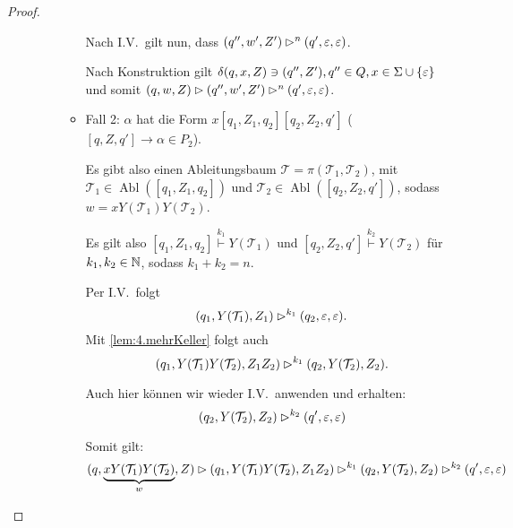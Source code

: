 \begin{proof}
\begin{itemize}
\begin{description}
\begin{itemize}
	  Nach I.V.\ gilt nun, dass $(q'', w', Z') \rhd^n (q',\varepsilon,\varepsilon)$.
	  
	  Nach Konstruktion gilt $\delta(q, x, Z) \ni (q'', Z'), q'' \in Q, x \in \Sigma \cup \{\varepsilon\}$ und somit
	  $(q, w, Z) \rhd (q'', w', Z') \rhd^n (q',\varepsilon,\varepsilon)$.
      \item Fall 2: $\alpha$ hat die Form $x[q_1,Z_1,q_2][q_2, Z_2, q']$ ($[q,Z,q']\rightarrow\alpha \in P_2$).
      
      Es gibt also einen Ableitungsbaum $\mathcal{T} = \pi(\mathcal{T}_1,\mathcal{T}_2)$, mit $\mathcal{T}_1 \in \operatorname{Abl}([q_1, Z_1, q_2])$ und $\mathcal{T}_2 \in \operatorname{Abl}([q_2, Z_2, q'])$, sodass $w = xY(\mathcal{T}_1)Y(\mathcal{T}_2)$.
      
      Es gilt also $[q_1, Z_1, q_2]\stackrel{k_1}{\vdash} Y(\mathcal{T}_1)$ und 
      $[q_2, Z_2, q']\stackrel{k_2}{\vdash} Y(\mathcal{T}_2)$ für $k_1,k_2\in\mathbb{N}$, sodass $k_1+k_2=n$.
      
          Per I.V.\ folgt
          \begin{displaymath}
            (q_1, Y(\mathcal{T}_1), Z_1) \rhd^{k_1} (q_2, \varepsilon, \varepsilon).
          \end{displaymath}
          Mit \autoref{lem:4.mehrKeller} folgt auch
          \begin{displaymath}
            (q_1, Y(\mathcal{T}_1)Y(\mathcal{T}_2), Z_1Z_2) \rhd^{k_1} (q_2, Y(\mathcal{T}_2), Z_2).
          \end{displaymath}
          

      Auch hier können wir wieder I.V.\ anwenden und erhalten:
          \begin{displaymath}
            (q_2, Y(\mathcal{T}_2), Z_2) \rhd^{k_2} (q', \varepsilon, \varepsilon)
          \end{displaymath}
          
                    Somit gilt:
          \begin{displaymath}
            (q, \underbrace{xY(\mathcal{T}_1)Y(\mathcal{T}_2)}_{w}, Z) \rhd (q_1, Y(\mathcal{T}_1)Y(\mathcal{T}_2), Z_1Z_2) \rhd^{k_1} (q_2, Y(\mathcal{T}_2), Z_2) \rhd^{k_2} (q', \varepsilon, \varepsilon)
          \end{displaymath}
      \end{itemize}
      
     \end{description}

    \end{itemize}
    

\end{proof}
